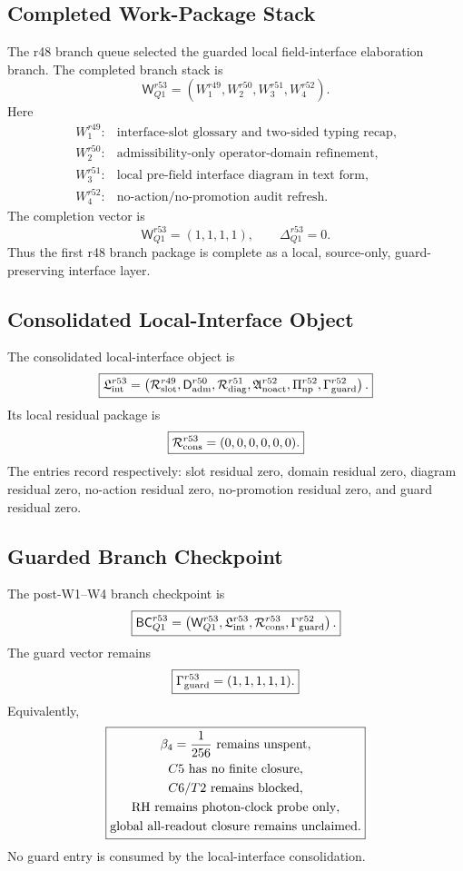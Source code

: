 \subsection{Completed Work-Package Stack}
\label{subsec:r53-completed-work-package-stack}

The r48 branch queue selected the guarded local field-interface elaboration branch.  The completed branch stack is
\[
\boxed{
\mathsf W_{Q1}^{r53}
=
\left(
W_1^{r49},
W_2^{r50},
W_3^{r51},
W_4^{r52}
\right).
}
\]
Here
\[
\begin{array}{ll}
W_1^{r49}:& \text{interface-slot glossary and two-sided typing recap},\\
W_2^{r50}:& \text{admissibility-only operator-domain refinement},\\
W_3^{r51}:& \text{local pre-field interface diagram in text form},\\
W_4^{r52}:& \text{no-action/no-promotion audit refresh}.
\end{array}
\]
The completion vector is
\[
\boxed{
\mathsf W_{Q1}^{r53}=(1,1,1,1),
\qquad
\Delta_{Q1}^{r53}=0.
}
\]
Thus the first r48 branch package is complete as a local, source-only, guard-preserving interface layer.

\subsection{Consolidated Local-Interface Object}
\label{subsec:r53-consolidated-local-interface-object}

The consolidated local-interface object is
\[
\boxed{
\mathfrak L_{\rm int}^{r53}
=
\left(
\mathcal R_{\rm slot}^{r49},
\mathsf D_{\rm adm}^{r50},
\mathcal R_{\rm diag}^{r51},
\mathfrak A_{\rm noact}^{r52},
\Pi_{\rm np}^{r52},
\Gamma_{\rm guard}^{r52}
\right).
}
\]
Its local residual package is
\[
\boxed{
\mathcal R_{\rm cons}^{r53}
=(0,0,0,0,0,0).
}
\]
The entries record respectively: slot residual zero, domain residual zero, diagram residual zero, no-action residual zero, no-promotion residual zero, and guard residual zero.

\subsection{Guarded Branch Checkpoint}
\label{subsec:r53-guarded-branch-checkpoint}

The post-W1--W4 branch checkpoint is
\[
\boxed{
\mathsf{BC}_{Q1}^{r53}
=
\left(
\mathsf W_{Q1}^{r53},
\mathfrak L_{\rm int}^{r53},
\mathcal R_{\rm cons}^{r53},
\Gamma_{\rm guard}^{r52}
\right).
}
\]
The guard vector remains
\[
\boxed{
\Gamma_{\rm guard}^{r53}=(1,1,1,1,1).
}
\]
Equivalently,
\[
\boxed{
\begin{gathered}
\beta_4={1\over256}\text{ remains unspent},\\
C5\text{ has no finite closure},\\
C6/T2\text{ remains blocked},\\
\mathrm{RH}\text{ remains photon-clock probe only},\\
\text{global all-readout closure remains unclaimed}.
\end{gathered}
}
\]
No guard entry is consumed by the local-interface consolidation.

